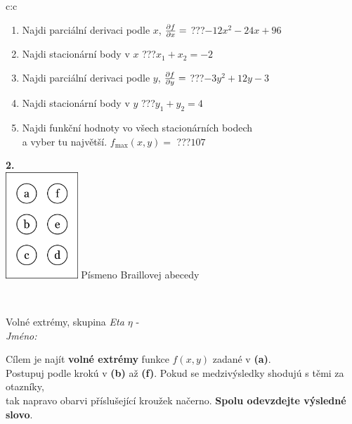 \documentclass[10pt]{report}
\begin{document}
\begin{tabular}{c:c}
\begin{minipage}[c][104.5mm][t]{0.5\linewidth}
\begin{center}
\begin{minipage}{0.79\linewidth}
\begin{center}
\begin{varwidth}{\linewidth}
\begin{enumerate}
\item Najdi parciální derivaci podle $x$, $\pdv{f}{x}=$\quad \dotfill\; ???\;\dotfill \quad $-12x^2-24x+96$
\item Najdi stacionární body v $x$\quad \dotfill\; ???\;\dotfill \quad $x_1+x_2=-2$
\item Najdi parciální derivaci podle $y$, $\pdv{f}{y}=$\quad \dotfill\; ???\;\dotfill \quad $-3y^2+12y-3$
\item Najdi stacionární body v $y$\quad \dotfill\; ???\;\dotfill \quad $y_1+y_2=4$
\item Najdi funkční hodnoty vo všech stacionárních bodech \\ \phantom{xxxxxx} a vyber tu najvětší. $f_{\text{max}}(x,y)=$\quad \dotfill\; ???\;\dotfill \quad $107$
\end{enumerate}
\end{varwidth}
\end{center}
\end{minipage}
\begin{minipage}{0.20\linewidth}
\begin{center}
{\Huge\bfseries 2.} \\[2mm]
\includegraphics[height=40mm]{../images/braille.png}
{\small Písmeno Braillovej abecedy}
\end{center}
\end{minipage}
\end{center}
\end{minipage}
\\ \hdashline
\begin{minipage}[c][104.5mm][t]{0.5\linewidth}
\begin{center}
\vspace{7mm}
{\huge Volné extrémy, skupina \textit{Eta $\eta$} -}\\[5mm]
\textit{Jméno:}\phantom{xxxxxxxxxxxxxxxxxxxxxxxxxxxxxxxxxxxxxxxxxxxxxxxxxxxxxxxxxxxxxxxxx}\\[5mm]
\begin{minipage}{0.95\linewidth}
\begin{center}
Cílem je najít \textbf{volné extrémy} funkce $f(x,y)$ zadané v \textbf{(a)}.\\Postupuj podle krokú v \textbf{(b)} až \textbf{(f)}. Pokud se medzivýsledky shodujú s těmi za otazníky,\\tak napravo obarvi příslušející kroužek načerno. \textbf{Spolu odevzdejte výsledné slovo}.

\end{center}
\end{minipage}
\end{center}
\end{minipage}
\end{tabular}
\end{document}
